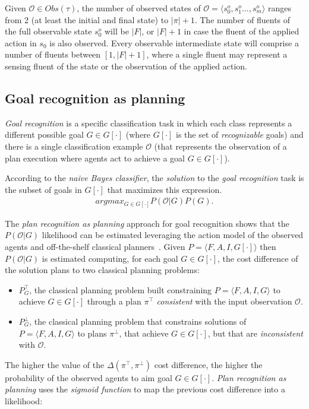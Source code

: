 \documentclass[letterpaper]{article} %
\newcommand{\tup}[1]{{\langle #1 \rangle}}
\begin{document}
Given $\mathcal{O} \in Obs(\tau)$, the number of observed states of $\mathcal{O}=\tup{s_0^o,s_1^o \ldots , s_m^o}$ ranges from 2 (at least the initial and final state) to $|\pi|+1$. The number of fluents of the full observable state $s_0^o$ will be $|F|$, or $|F|+1$ in case the fluent of the applied action in $s_0$ is also observed. Every observable intermediate state will comprise a number of fluents between $[1,|F|+1]$, where a single fluent may represent a sensing fluent of the state or the observation of the applied action.

\subsection{Goal recognition as planning}
{\em Goal recognition} is a specific classification task in which each class represents a different possible goal $G\in G[\cdot]$ (where $G[\cdot]$ is the set of {\em recognizable} goals) and there is a single classification example $\mathcal{O}$ (that represents the observation of a plan execution where agents act to achieve a goal $G\in G[\cdot]$).

According to the {\em naive Bayes classifier}, the {\em solution} to the {\em goal recognition} task is the subset of goals in $G[\cdot]$ that maximizes this expression.
\begin{align}
argmax_{G\in G[\cdot]} P(\mathcal{O}|G) P(G).
\end{align}

The {\em plan recognition as planning} approach for goal recognition shows that the $P(\mathcal{O}|G)$ likelihood can be estimated leveraging the action model of the observed agents and off-the-shelf classical planners~\cite{ramirez2012plan}. Given $P=\tup{F,A,I,G[\cdot]}$ then $P(\mathcal{O}|G)$ is estimated computing, for each goal $G\in G[\cdot]$, the cost difference of the solution plans to two classical planning problems:
\begin{itemize}
\item $P^{\top}_G$, the classical planning problem built constraining $P=\tup{F,A,I,G}$ to achieve $G\in G[\cdot]$ through a plan $\pi^\top$ {\em consistent} with the input observation $\mathcal{O}$.
\item $P^{\bot}_G$, the classical planning problem that constrains solutions of $P=\tup{F,A,I,G}$ to plans $\pi^\bot$, that achieve $G\in G[\cdot]$, but that are {\em inconsistent} with $\mathcal{O}$.
\end{itemize}

The higher the value of the $\Delta(\pi^\top,\pi^\bot)$ cost difference, the higher the probability of the observed agents to aim goal $G\in G[\cdot]$. {\em Plan recognition as planning} uses the {\em sigmoid function} to map the previous cost difference into a likelihood:
\end{document}
